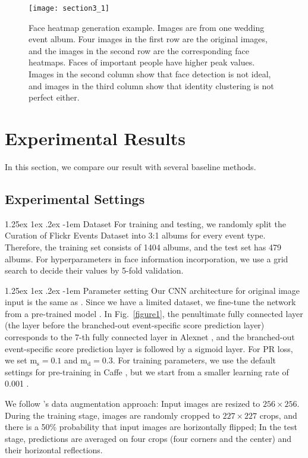 \documentclass[10pt,twocolumn,letterpaper]{article}
\makeatletter
\renewcommand\paragraph{\@startsection{paragraph}{4}{\z@}%
           {1.25ex \@plus1ex \@minus.2ex}%
           {-1em}%
           {\normalfont\normalsize\bfseries}}
\makeatother
\begin{document}
\begin{figure}[h]
\centering
\texttt{[image: section3\_1]}
\caption{Face heatmap generation example. Images are from one wedding event album. Four images in the first row are the original images, and the images in the second row are the corresponding face heatmaps. Faces of important people have higher peak values. Images in the second column show that face detection is not ideal, and images in the third column show that identity clustering is not perfect either.}
\label{figure4}
\end{figure}
 
\section{Experimental Results}
In this section, we compare our result with several baseline methods.
\subsection{Experimental Settings}
\paragraph{Dataset}
For training and testing, we randomly split the  Curation of Flickr Events Dataset into 3:1 albums for every event type. Therefore, the training set consists of 1404 albums, and the test set has 479 albums.  For hyperparameters in face information incorporation, we use a grid search to decide their values by 5-fold validation. 

\paragraph{Parameter setting}
Our CNN architecture for original image input is the same as \cite{imagenet}. Since we have a limited dataset, we fine-tune the network from a pre-trained model \cite{caffe}. In Fig.~\ref{figure1}, the penultimate fully connected layer (the layer before the branched-out event-specific score prediction layer) corresponds to the 7-th fully connected layer in Alexnet \cite{caffe}, and the branched-out event-specific score prediction layer is followed by a sigmoid layer. For PR loss, we set $\text{m}_\text{s} = 0.1$ and $\text{m}_\text{d} = 0.3$. For training parameters, we use the default settings for pre-training in Caffe \cite{caffe}, but we start from a smaller learning rate of 0.001 \cite{rcnn}. 

We follow \cite{imagenet} 's data augmentation approach: Input images are resized to $256\times 256$. During the training stage, images are randomly cropped to $227 \times 227$ crops, and there is a 50\% probability that input images are horizontally flipped; In the test stage, predictions are averaged on four crops (four corners and the center) and their horizontal reflections.
\end{document}
